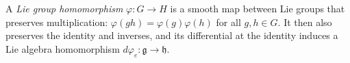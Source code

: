 
A \emph{Lie group homomorphism} $\varphi:G\to H$ is a smooth map between Lie groups that preserves multiplication: $\varphi(gh)=\varphi(g)\varphi(h)$ for all $g,h\in G$. It then also preserves the identity and inverses, and its differential at the identity induces a Lie algebra homomorphism $d\varphi_e:\mathfrak g\to\mathfrak h$.
